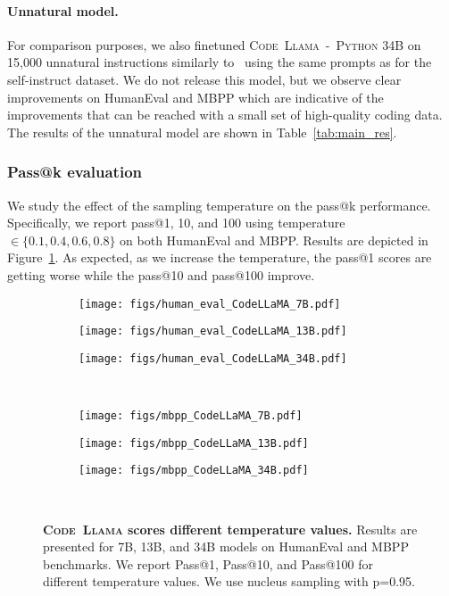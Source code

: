 \documentclass[10pt]{article}
\newcommand{\model}{\textsc{Code~Llama}\xspace}
\newcommand{\pymodel}{\textsc{Code~Llama~-~Python}\xspace}
\begin{document}
\paragraph{Unnatural model.} For comparison purposes, we also finetuned \pymodel 34B on 15,000 unnatural instructions similarly to~\citet{honovich2022unnatural} using the same prompts as for the self-instruct dataset. We do not release this model, but we observe clear improvements on HumanEval and MBPP which are indicative of the improvements that can be reached with a small set of high-quality coding data. The results of the unnatural model are shown in Table~\ref{tab:main_res}. 



\subsubsection{Pass@k evaluation} We study the effect of the sampling temperature on the pass@k performance. Specifically, we report pass@1, 10, and 100 using temperature $\in \{0.1, 0.4, 0.6, 0.8\}$ on both HumanEval and MBPP. Results are depicted in Figure~\ref{fig:abb_temp}. As expected, as we increase the temperature, the pass@1 scores are getting worse while the pass@10 and pass@100 improve. 

\begin{figure}[t!]
     \centering
     \begin{subfigure}[b]{0.32\textwidth}
         \centering
         \texttt{[image: figs/human\_eval\_CodeLLaMA\_7B.pdf]}         
     \end{subfigure}
     \hfill
     \begin{subfigure}[b]{0.32\textwidth}
         \centering
         \texttt{[image: figs/human\_eval\_CodeLLaMA\_13B.pdf]}
     \end{subfigure}
     \hfill
     \begin{subfigure}[b]{0.32\textwidth}
         \centering
         \texttt{[image: figs/human\_eval\_CodeLLaMA\_34B.pdf]}
     \end{subfigure} \\
     \begin{subfigure}[b]{0.32\textwidth}
         \centering
         \texttt{[image: figs/mbpp\_CodeLLaMA\_7B.pdf]}
     \end{subfigure}
     \hfill
     \begin{subfigure}[b]{0.32\textwidth}
         \centering
         \texttt{[image: figs/mbpp\_CodeLLaMA\_13B.pdf]}
     \end{subfigure}
     \hfill
     \begin{subfigure}[b]{0.32\textwidth}
         \centering
         \texttt{[image: figs/mbpp\_CodeLLaMA\_34B.pdf]}
     \end{subfigure} \\
    \caption{\textbf{\model scores different temperature values.} Results are presented for 7B, 13B, and 34B models on HumanEval and MBPP benchmarks. We report Pass@1, Pass@10, and Pass@100 for different temperature values. We use nucleus sampling with p=0.95.}
    \label{fig:abb_temp}
\end{figure}
 
\end{document}

